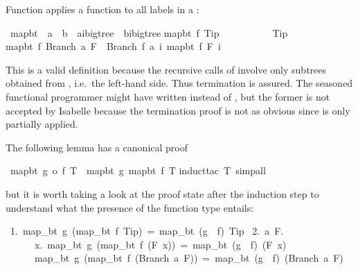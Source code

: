 \begin{isabelle}
\begin{isamarkuptext}
Function  applies a function to all labels in a :%
\end{isamarkuptext}%
\ map{\isacharunderscore}bt\ {\isacharcolon}{\isacharcolon}\ {\isachardoublequote}{\isacharparenleft}{\isacharprime}a\ {\isasymRightarrow}\ {\isacharprime}b{\isacharparenright}\ {\isasymRightarrow}\ {\isacharparenleft}{\isacharprime}a{\isacharcomma}{\isacharprime}i{\isacharparenright}bigtree\ {\isasymRightarrow}\ {\isacharparenleft}{\isacharprime}b{\isacharcomma}{\isacharprime}i{\isacharparenright}bigtree{\isachardoublequote}\isanewline
{}\isanewline
{\isachardoublequote}map{\isacharunderscore}bt\ f\ Tip\ \ \ \ \ \ \ \ \ \ {\isacharequal}\ Tip{\isachardoublequote}\isanewline
{\isachardoublequote}map{\isacharunderscore}bt\ f\ {\isacharparenleft}Branch\ a\ F{\isacharparenright}\ {\isacharequal}\ Branch\ {\isacharparenleft}f\ a{\isacharparenright}\ {\isacharparenleft}{\isasymlambda}i{\isachardot}\ map{\isacharunderscore}bt\ f\ {\isacharparenleft}F\ i{\isacharparenright}{\isacharparenright}{\isachardoublequote}%
\begin{isamarkuptext}%
\noindent This is a valid  definition because the
recursive calls of  involve only subtrees obtained from
, i.e.\ the left-hand side. Thus termination is assured.  The
seasoned functional programmer might have written 
instead of , but the former is not accepted by
Isabelle because the termination proof is not as obvious since
 is only partially applied.

The following lemma has a canonical proof%
\end{isamarkuptext}%
\ {\isachardoublequote}map{\isacharunderscore}bt\ {\isacharparenleft}g\ o\ f{\isacharparenright}\ T\ {\isacharequal}\ map{\isacharunderscore}bt\ g\ {\isacharparenleft}map{\isacharunderscore}bt\ f\ T{\isacharparenright}{\isachardoublequote}\isanewline
{}induct{\isacharunderscore}tac\ {\isachardoublequote}T{\isachardoublequote}{\isacharcomma}\ simp{\isacharunderscore}all{\isacharparenright}%
\begin{isamarkuptext}%
\noindent
but it is worth taking a look at the proof state after the induction step
to understand what the presence of the function type entails:
\begin{isabellepar}%
~1.~map\_bt~g~(map\_bt~f~Tip)~=~map\_bt~(g~{\isasymcirc}~f)~Tip\isanewline
~2.~{\isasymAnd}a~F.\isanewline
~~~~~~{\isasymforall}x.~map\_bt~g~(map\_bt~f~(F~x))~=~map\_bt~(g~{\isasymcirc}~f)~(F~x)~{\isasymLongrightarrow}\isanewline
~~~~~~map\_bt~g~(map\_bt~f~(Branch~a~F))~=~map\_bt~(g~{\isasymcirc}~f)~(Branch~a~F)%
\end{isabellepar}%
\end{isamarkuptext}%
\end{isabelle}%
